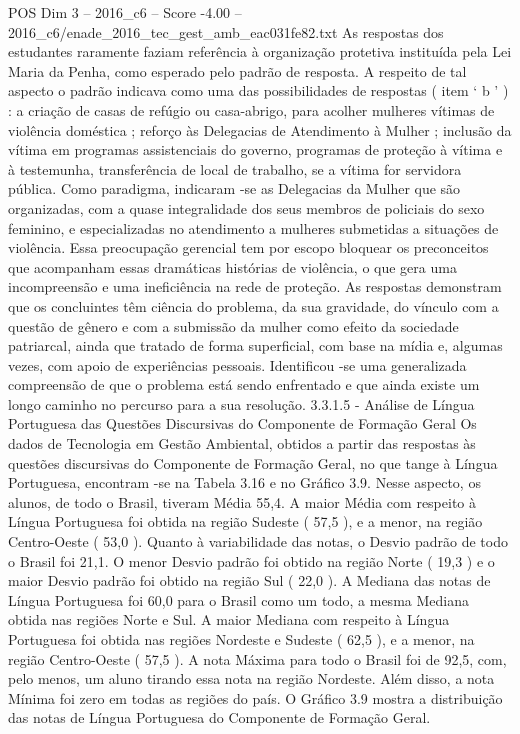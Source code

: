 \begin{textsample}{POS Dim 3 – 2016\_c6 – Score -4.00 – 2016\_c6/enade\_2016\_tec\_gest\_amb\_eac031fe82.txt}
As respostas dos estudantes raramente faziam referência à organização protetiva instituída pela Lei Maria da Penha, como esperado pelo padrão de resposta.
A respeito de tal aspecto o padrão indicava como uma das possibilidades de respostas ( item ‘ b ’ ) : a criação de casas de refúgio ou casa-abrigo, para acolher mulheres vítimas de violência doméstica ; reforço às Delegacias de Atendimento à Mulher ; inclusão da vítima em programas assistenciais do governo, programas de proteção à vítima e à testemunha, transferência de local de trabalho, se a vítima for servidora pública.
Como paradigma, indicaram -se as Delegacias da Mulher que são organizadas, com a quase integralidade dos seus membros de policiais do sexo feminino, e especializadas no atendimento a mulheres submetidas a situações de violência.
Essa preocupação gerencial tem por escopo bloquear os preconceitos que acompanham essas dramáticas histórias de violência, o que gera uma incompreensão e uma ineficiência na rede de proteção.
As respostas demonstram que os concluintes têm ciência do problema, da sua gravidade, do vínculo com a questão de gênero e com a submissão da mulher como efeito da sociedade patriarcal, ainda que tratado de forma superficial, com base na mídia e, algumas vezes, com apoio de experiências pessoais.
Identificou -se uma generalizada compreensão de que o problema está sendo enfrentado e que ainda existe um longo caminho no percurso para a sua resolução. 3.3.1.5 - Análise de Língua Portuguesa das Questões Discursivas do Componente de Formação Geral Os dados de Tecnologia em Gestão Ambiental, obtidos a partir das respostas às questões discursivas do Componente de Formação Geral, no que tange à Língua Portuguesa, encontram -se na Tabela 3.16 e no Gráfico 3.9.
Nesse aspecto, os alunos, de todo o Brasil, tiveram Média 55,4.
A maior Média com respeito à Língua Portuguesa foi obtida na região Sudeste ( 57,5 ), e a menor, na região Centro-Oeste ( 53,0 ).
Quanto à variabilidade das notas, o Desvio padrão de todo o Brasil foi 21,1.
O menor Desvio padrão foi obtido na região Norte ( 19,3 ) e o maior Desvio padrão foi obtido na região Sul ( 22,0 ).
A Mediana das notas de Língua Portuguesa foi 60,0 para o Brasil como um todo, a mesma Mediana obtida nas regiões Norte e Sul.
A maior Mediana com respeito à Língua Portuguesa foi obtida nas regiões Nordeste e Sudeste ( 62,5 ), e a menor, na região Centro-Oeste ( 57,5 ).
A nota Máxima para todo o Brasil foi de 92,5, com, pelo menos, um aluno tirando essa nota na região Nordeste.
Além disso, a nota Mínima foi zero em todas as regiões do país.
O Gráfico 3.9 mostra a distribuição das notas de Língua Portuguesa do Componente de Formação Geral.

\end{textsample}
